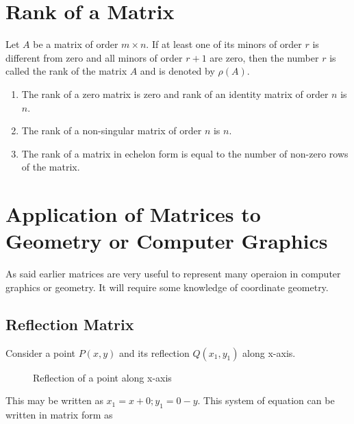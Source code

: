 \section{Rank of a Matrix}
Let $A$ be a matrix of order $m\times n$. If at least one of its minors of order $r$ is different from zero and all minors of order
$r + 1$ are zero, then the number $r$ is called the rank of the matrix $A$ and is denoted by $\rho(A)$.

\begin{enumerate}
\item The rank of a zero matrix is zero and rank of an identity matrix of order $n$ is $n$.
\item The rank of a non-singular matrix of order $n$ is $n$.
\item The rank of a matrix in echelon form is equal to the number of non-zero rows of the matrix.
\end{enumerate}

\section{Application of Matrices to Geometry or Computer Graphics}
As said earlier matrices are very useful to represent many operaion in computer
graphics or geometry. It will require some knowledge of coordinate geometry.

\subsection{Reflection Matrix}
Consider a point $P(x, y)$ and its reflection $Q(x_1, y_1)$ along
x-axis.

\begin{figure}
  \begin{center}
    \caption{Reflection of a point along x-axis}
  \end{center}
\end{figure}

This may be written as $x_1 = x + 0; y_1 = 0 - y$. This system of equation can be written in matrix form as

